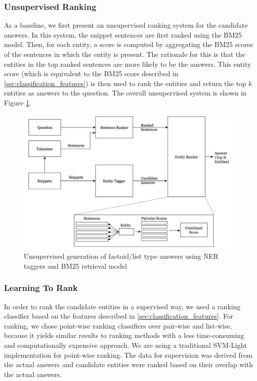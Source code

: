 \subsubsection{Unsupervised Ranking}

As a baseline, we first present an unsupervised ranking system for the candidate answers. In this system, the snippet sentences are first ranked using the BM25 model. Then, for each entity, a score is computed by aggregating the BM25 scores of the sentences in which the entity is present. The rationale for this is that the entities in the top ranked sentences are more likely to be the answers. This entity score (which is equivalent to the BM25 score described in \ref{sec:classification_features}) is then used to rank the entities and return the top $k$ entities as answers to the question. The overall unsupervised system is shown in Figure \ref{fig:UnsupervisedNERPipeline}.

\begin{figure}
    \centering
    \includegraphics[scale=0.4]{images/UnsupervisedNERPipeline.png}
    \caption{Unsupervised generation of factoid/list type answers using NER taggers and BM25 retrieval model}
    \label{fig:UnsupervisedNERPipeline}
\end{figure}

\subsubsection{Learning To Rank}

In order to rank the candidate entities in a supervised way, we used a ranking classifier based on the features described in \ref{sec:classification_features}. For ranking, we chose point-wise ranking classifiers over pair-wise and list-wise, because it yields similar results to ranking methods with a less time-consuming and computationally expensive approach. We are using a traditional SVM-Light \cite{svmlight} implementation for point-wise ranking. The data for supervision was derived from the actual answers and candidate entities were ranked based on their overlap with the actual answers. 

